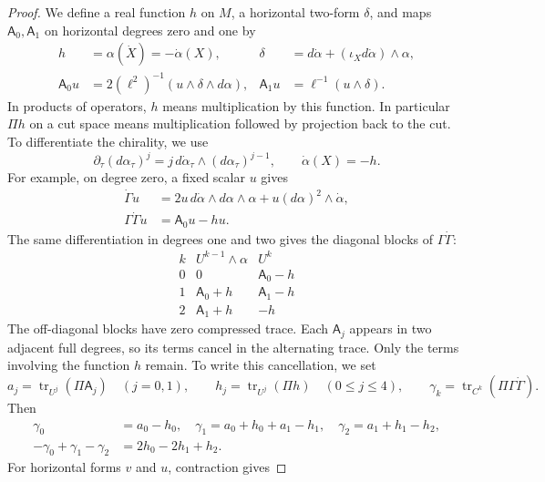 \documentclass[11pt,letterpaper,reqno]{amsart}
\theoremstyle{remark}
\newcommand{\tr}{\operatorname{tr}}
\begin{document}
\begin{proof}
We define a real function $h$ on $M$, a horizontal two-form $\delta$, and maps
$\mathsf A_0,\mathsf A_1$ on horizontal degrees zero and one by
\begin{equation}\label{xp:chirality-bundle-maps}
 \begin{aligned}
 h&=\alpha(\dot X)=-\dot\alpha(X),
 &\delta&=d\dot\alpha+(\iota_Xd\dot\alpha)\wedge\alpha,\\
 \mathsf A_0u&=2(\ell^2)^{-1}(u\wedge\delta\wedge d\alpha),
 &\mathsf A_1u&=\ell^{-1}(u\wedge\delta).
 \end{aligned}
\end{equation}
In products of operators, $h$ means multiplication by this function.
In particular $\Pi h$ on a cut space means multiplication followed
by projection back to the cut.
To differentiate the chirality, we use
\[
 \partial_\tau(d\alpha_\tau)^j
 =j\,d\dot\alpha_\tau\wedge(d\alpha_\tau)^{j-1},
 \qquad\dot\alpha(X)=-h.
\]
For example, on degree zero, a fixed scalar $u$ gives
\[
 \begin{aligned}
 \dot\Gamma u
 &=2u\,d\dot\alpha\wedge d\alpha\wedge\alpha
      +u(d\alpha)^2\wedge\dot\alpha,\\
 \Gamma\dot\Gamma u&=\mathsf A_0u-hu.
 \end{aligned}
\]
The same differentiation in degrees one and two gives the diagonal
blocks of $\Gamma\dot\Gamma$:
\[
 \begin{array}{c|cc}
 k&U^{k-1}\wedge\alpha&U^k\\ \hline
 0&0&\mathsf A_0-h\\
 1&\mathsf A_0+h&\mathsf A_1-h\\
 2&\mathsf A_1+h&-h
 \end{array}
\]
The off-diagonal blocks have zero compressed trace.
Each $\mathsf A_j$ appears in two adjacent full degrees, so its
terms cancel in the alternating trace. Only the terms involving
the function $h$ remain. To write this cancellation, we set
\[
 a_j=\tr_{U^j}(\Pi\mathsf A_j)\quad(j=0,1),\qquad
 h_j=\tr_{U^j}(\Pi h)\quad(0\leq j\leq4),\qquad
 \gamma_k=\tr_{C^k}(\Pi\Gamma\dot\Gamma).
\]
Then
\begin{equation}\label{xp:chirality-trace-cancellation}
 \begin{aligned}
 \gamma_0&=a_0-h_0,\quad
 \gamma_1=a_0+h_0+a_1-h_1,\quad
 \gamma_2=a_1+h_1-h_2,\\
 -\gamma_0+\gamma_1-\gamma_2&=2h_0-2h_1+h_2.
 \end{aligned}
\end{equation}
For horizontal forms $v$ and $u$, contraction gives

\end{proof}
\end{document}
